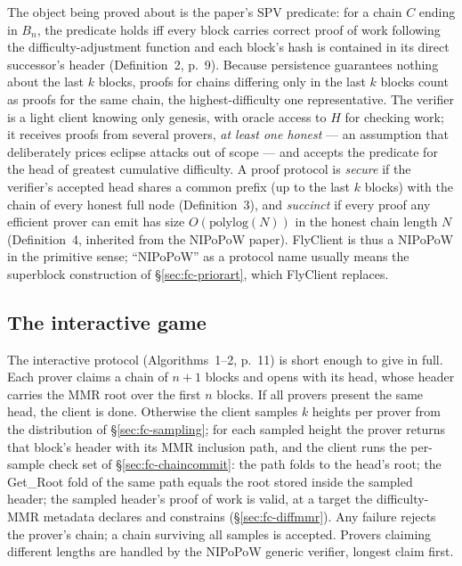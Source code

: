 \documentclass[11pt,a4paper]{article}
\theoremstyle{definition}
\begin{document}
The object being proved about is the paper's SPV predicate: for a chain
$C$ ending in $B_n$, the predicate holds iff every block carries correct
proof of work following the difficulty-adjustment function and each
block's hash is contained in its direct successor's header (Definition~2,
p.~9). Because persistence guarantees nothing about the last $k$ blocks,
proofs for chains differing only in the last $k$ blocks count as proofs
for the same chain, the highest-difficulty one representative. The
verifier is a light client knowing only genesis, with oracle access to
$H$ for checking work; it receives proofs from several provers, \emph{at
least one honest} --- an assumption that deliberately prices eclipse
attacks out of scope --- and accepts the predicate for the head of
greatest cumulative difficulty. A proof protocol is \emph{secure} if the
verifier's accepted head shares a common prefix (up to the last $k$
blocks) with the chain of every honest full node (Definition~3), and
\emph{succinct} if every proof any efficient prover can emit has size
$O(\mathrm{polylog}(N))$ in the honest chain length $N$ (Definition~4,
inherited from the NIPoPoW paper). FlyClient is thus a NIPoPoW in the
primitive sense; ``NIPoPoW'' as a protocol name usually means the
superblock construction of \S\ref{sec:fc-priorart}, which FlyClient
replaces.

\subsection{The interactive game}\label{sec:fc-game}

The interactive protocol (Algorithms~1--2, p.~11) is short enough to give
in full. Each prover claims a chain of $n+1$ blocks and opens with its
head, whose header carries the MMR root over the first $n$ blocks. If all
provers present the same head, the client is done. Otherwise the client
samples $k$ heights per prover from the distribution of
\S\ref{sec:fc-sampling}; for each sampled height the prover returns that
block's header with its MMR inclusion path, and the client runs the
per-sample check set of \S\ref{sec:fc-chaincommit}: the path folds to the
head's root; the \textsf{Get\_Root} fold of the same path equals the root
stored inside the sampled header; the sampled header's proof of work is
valid, at a target the difficulty-MMR metadata declares and constrains
(\S\ref{sec:fc-diffmmr}). Any failure rejects the prover's chain; a chain
surviving all samples is accepted. Provers claiming different lengths are
handled by the NIPoPoW generic verifier, longest claim first.
\end{document}
